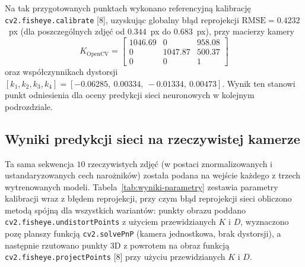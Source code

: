 Na tak przygotowanych punktach wykonano referencyjną kalibrację
\texttt{cv2.fisheye.calibrate} [8], uzyskując globalny błąd reprojekcji
$\mathrm{RMSE} = 0.4232$~px (dla poszczególnych zdjęć od $0.344$~px do
$0.683$~px), przy macierzy kamery
\begin{equation}
  K_{\text{OpenCV}} = \begin{bmatrix}
    1046.69 & 0 & 958.08 \\
    0 & 1047.87 & 500.37 \\
    0 & 0 & 1
  \end{bmatrix}
\end{equation}
oraz współczynnikach dystorsji $[k_1,k_2,k_3,k_4] = [-0.06285,\ 0.00334,\
-0.01334,\ 0.00473]$. Wynik ten stanowi punkt odniesienia
dla oceny predykcji sieci neuronowych w kolejnym podrozdziale.

\subsection{Wyniki predykcji sieci na rzeczywistej kamerze}
\label{sec:wyniki-realne}

Ta sama sekwencja $10$ rzeczywistych zdjęć (w postaci znormalizowanych i
ustandaryzowanych cech narożników) została podana na wejście
każdego z trzech wytrenowanych modeli. Tabela~\ref{tab:wyniki-parametry}
zestawia parametry kalibracji wraz z błędem reprojekcji, przy
czym błąd reprojekcji sieci obliczono metodą spójną dla wszystkich wariantów:
punkty obrazu poddano \texttt{cv2.fisheye.undistortPoints} z użyciem
przewidzianych $K$ i $D$, wyznaczono pozę planszy funkcją
\texttt{cv2.solvePnP} (kamera jednostkowa, brak dystorsji), a następnie
rzutowano punkty 3D z powrotem na obraz funkcją
\texttt{cv2.fisheye.projectPoints} [8] przy użyciu przewidzianych $K$ i $D$.

